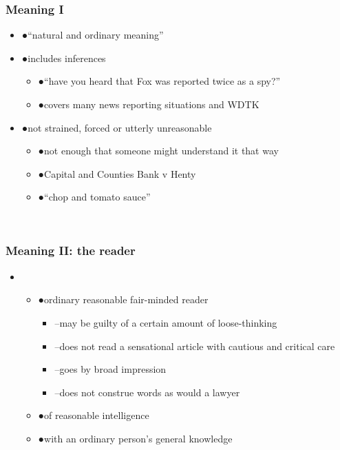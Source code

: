 \documentclass[ignorenonframetext,]{beamer}
\begin{document}
\begin{frame}
\frametitle{Meaning I}

\begin{itemize}
\item  {●}``natural and ordinary meaning''
\item  {●}includes inferences

  \begin{itemize}
  \item    {●}``have you heard that Fox was reported twice as a spy?''
  \item    {●}covers many news reporting situations and WDTK
  \end{itemize}
\item  {●}not strained, forced or utterly unreasonable

  \begin{itemize}
  \item    {●}not enough that someone {might}{ understand it that way}
  \item    {●}{Capital and Counties Bank v Henty}
  \item    {●}{``}{chop and tomato sauce''}
  \end{itemize}
\end{itemize}

~


\end{frame}

\begin{frame}
\frametitle{Meaning II: the reader}

\begin{itemize}
\item  \begin{itemize}
  \item    {●}ordinary reasonable fair-minded reader

    \begin{itemize}
    \item      {--}may be guilty of a certain amount of loose-thinking
    \item      {--}does not read a sensational article with cautious and critical
      care
    \item      {--}goes by broad impression
    \item      {--}does not construe words as would a lawyer
    \end{itemize}
  \item    {●}of reasonable intelligence
  \item    {●}with an ordinary person's general knowledge
  \end{itemize}
\end{itemize}

~


\end{frame}
\end{document}
